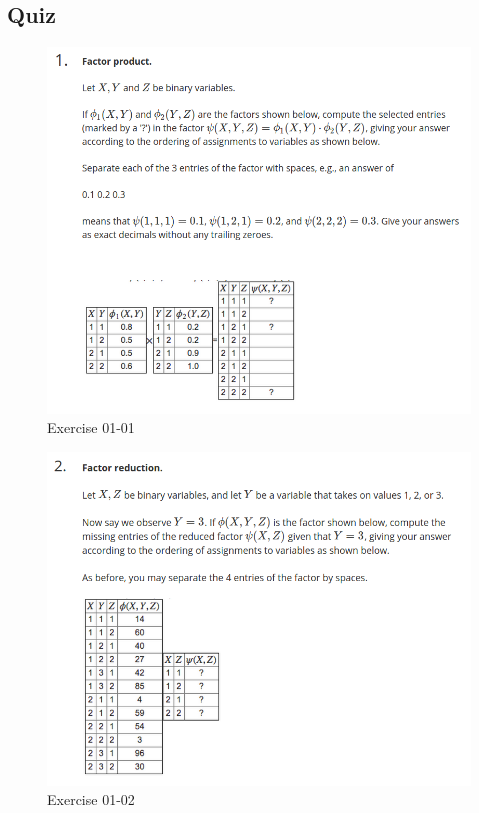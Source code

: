 \documentclass[12pt]{article}
\numberwithin{equation}{section}
\begin{document}
\subsection{Quiz}
\begin{figure}[H]
  \includegraphics[width=\linewidth]{PGMpics/01-01.png}
  \caption{Exercise 01-01}
  \label{fig:Exercise01-01}
\end{figure}

\begin{figure}[H]
  \includegraphics[width=\linewidth]{PGMpics/01-02.png}
  \caption{Exercise 01-02}
  \label{fig:Exercise01-02}
\end{figure}
\end{document}
